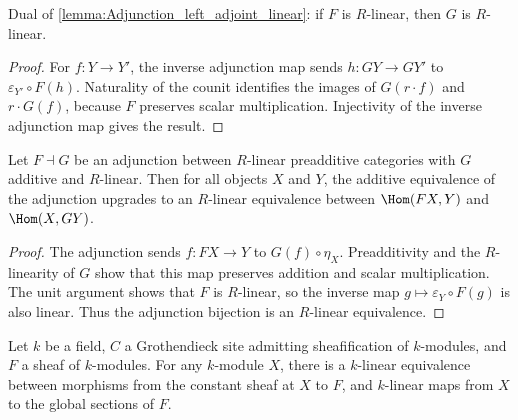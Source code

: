 \begin{lemma}\leanok
  \label{lemma:Adjunction_right_adjoint_linear}
  Dual of \cref{lemma:Adjunction_left_adjoint_linear}: if \(F\) is \(R\)-linear, then \(G\) is \(R\)-linear.
\end{lemma}

\begin{proof}
  \leanok
  For \(f:Y\to Y'\), the inverse adjunction map sends \(h:GY\to GY'\) to \(\varepsilon_{Y'}\circ F(h)\). Naturality of the counit identifies the images of \(G(r\cdot f)\) and \(r\cdot G(f)\), because \(F\) preserves scalar multiplication. Injectivity of the inverse adjunction map gives the result.
\end{proof}

\begin{theorem}\leanok
  \label{def:Adjunction_homLinearEquiv}

  Let \(F \dashv G\) be an adjunction between \(R\)-linear preadditive categories with \(G\) additive and \(R\)-linear. Then for all objects \(X\) and \(Y\), the additive equivalence of the adjunction upgrades to an \(R\)-linear equivalence between \(\Hom(FX, Y)\) and \(\Hom(X, GY)\).
\end{theorem}

\begin{proof}
  \leanok
  The adjunction sends \(f:FX\to Y\) to \(G(f)\circ\eta_X\). Preadditivity and the \(R\)-linearity of \(G\) show that this map preserves addition and scalar multiplication. The unit argument shows that \(F\) is \(R\)-linear, so the inverse map \(g\mapsto\varepsilon_Y\circ F(g)\) is also linear. Thus the adjunction bijection is an \(R\)-linear equivalence.
\end{proof}

\begin{theorem}\leanok
  \label{def:Scheme_constantSheafGammaHom_linearEquiv}
  Let \(k\) be a field, \(C\) a Grothendieck site admitting sheafification of \(k\)-modules, and \(F\) a sheaf of \(k\)-modules. For any \(k\)-module \(X\), there is a \(k\)-linear equivalence between morphisms from the constant sheaf at \(X\) to \(F\), and \(k\)-linear maps from \(X\) to the global sections of \(F\).
\end{theorem}

